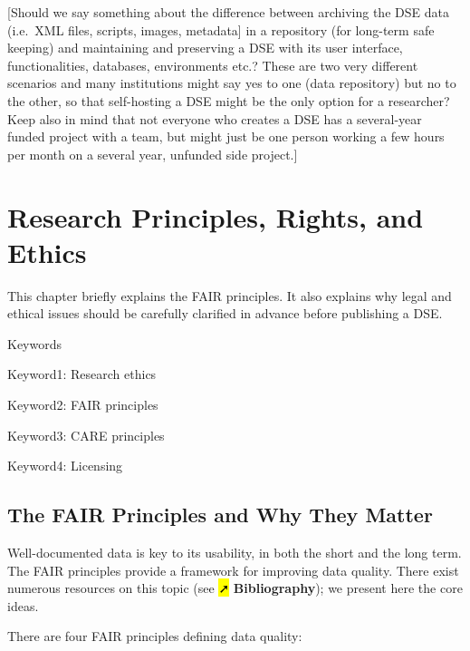 \documentclass[
  letterpaper,
  DIV=11,
  numbers=noendperiod]{scrreprt}
\begin{document}
{[}Should we say something about the difference between archiving the
DSE data (i.e.~XML files, scripts, images, metadata{]} in a repository
(for long-term safe keeping) and maintaining and preserving a DSE with
its user interface, functionalities, databases, environments etc.? These
are two very different scenarios and many institutions might say yes to
one (data repository) but no to the other, so that self-hosting a DSE
might be the only option for a researcher? Keep also in mind that not
everyone who creates a DSE has a several-year funded project with a
team, but might just be one person working a few hours per month on a
several year, unfunded side project.{]}

\section{Research Principles, Rights, and
Ethics}\label{research-principles-rights-and-ethics}

This chapter briefly explains the FAIR principles. It also explains why
legal and ethical issues should be carefully clarified in advance before
publishing a DSE.

Keywords

Keyword1: Research ethics

Keyword2: FAIR principles

Keyword3: CARE principles

Keyword4: Licensing

\subsection{The FAIR Principles and Why They
Matter}\label{the-fair-principles-and-why-they-matter}

Well-documented data is key to its usability, in both the short and the
long term. The FAIR principles provide a framework for improving data
quality. There exist numerous resources on this topic (see \hl{➚}
\textbf{Bibliography}); we present here the core ideas.

There are four FAIR principles defining data quality:
\end{document}
